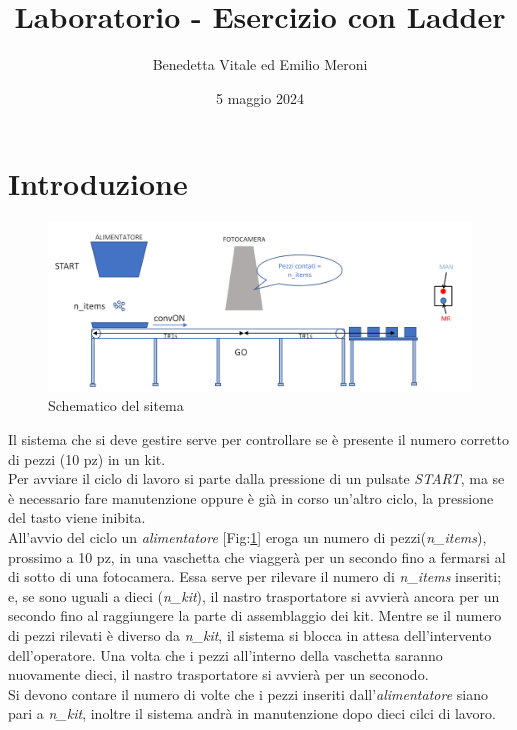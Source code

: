 \documentclass{article}
\title{Laboratorio - Esercizio con Ladder}
\author{Benedetta Vitale ed Emilio Meroni}
\date{5 maggio 2024}
\begin{document}
\maketitle

\tableofcontents

\section{Introduzione}

\begin{figure}[b]
    \centering
    \includegraphics[width = 0.8 \linewidth]{schematico.png}
    \caption{Schematico del sitema}
    \label{fig:schematico}
\end{figure}

Il sistema che si deve gestire serve per controllare se è presente il numero corretto di pezzi (10 pz) in un kit.
\\

Per avviare il ciclo di lavoro si parte dalla pressione di un pulsate \textit{START}, ma se è necessario fare manutenzione oppure è già in corso un'altro ciclo, la pressione del tasto viene inibita.
\\

All'avvio del ciclo un \textit{alimentatore} [Fig:\ref*{fig:schematico}] eroga un numero di pezzi(\textit{n\_items}), prossimo a 10 pz, in una vaschetta che viaggerà per un secondo fino a fermarsi al di sotto di una fotocamera. Essa serve per rilevare il numero di \textit{n\_items} inseriti; e, se sono uguali a dieci (\textit{n\_kit}), il nastro trasportatore si avvierà ancora per un secondo fino al raggiungere la parte di assemblaggio dei kit. Mentre se il numero di pezzi rilevati è diverso da \textit{n\_kit}, il sistema si blocca in attesa dell'intervento dell'operatore. Una volta che i pezzi all'interno della vaschetta saranno nuovamente dieci, il nastro trasportatore si avvierà per un seconodo.
\\

Si devono contare il numero di volte che i pezzi inseriti dall'\textit{alimentatore} siano pari a \textit{n\_kit}, inoltre il sistema andrà in manutenzione dopo dieci cilci di lavoro.
\end{document}
